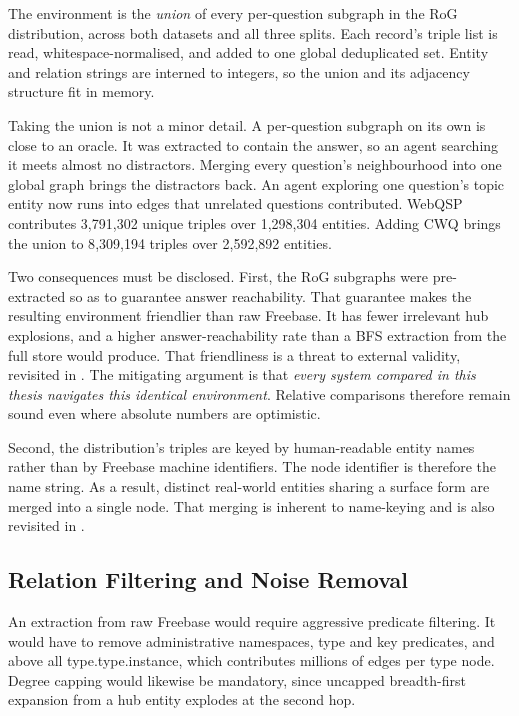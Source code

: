 The environment is the \emph{union} of every per-question subgraph in the
RoG distribution, across both datasets and all three
splits. Each record's triple list is read, whitespace-normalised, and added to
one global deduplicated set. Entity and relation strings are interned to
integers, so the union and its adjacency structure fit in memory.

Taking the union is not a minor detail. A per-question subgraph on its own is
close to an oracle. It was extracted to contain the answer, so an agent
searching it meets almost no distractors. Merging every question's neighbourhood
into one global graph brings the distractors back. An agent exploring one
question's topic entity now runs into edges that unrelated questions
contributed. WebQSP contributes 3{,}791{,}302 unique triples over 1{,}298{,}304
entities. Adding CWQ brings the union to 8{,}309{,}194 triples over
2{,}592{,}892 entities.

Two consequences must be disclosed. First, the RoG subgraphs were pre-extracted
so as to guarantee answer reachability. That guarantee makes the resulting
environment friendlier than raw Freebase. It has fewer irrelevant hub
explosions, and a higher answer-reachability rate than a BFS extraction from the
full store would produce. That friendliness is a threat to external validity,
revisited in . The mitigating argument is that \emph{every
system compared in this thesis navigates this identical environment}. Relative
comparisons therefore remain sound even where absolute numbers are optimistic.

Second, the distribution's triples are keyed by human-readable entity names
rather than by Freebase machine identifiers. The node identifier is therefore
the name string. As a result, distinct real-world entities sharing a surface
form are merged into a single node. That merging is inherent to name-keying and
is also revisited in .

\subsection{Relation Filtering and Noise Removal}

An extraction from raw Freebase would require aggressive predicate filtering. It
would have to remove administrative namespaces, type and key predicates, and
above all \textsf{type.type.instance}, which contributes millions of edges per
type node. Degree capping would likewise be mandatory, since uncapped
breadth-first expansion from a hub entity explodes at the second hop.

